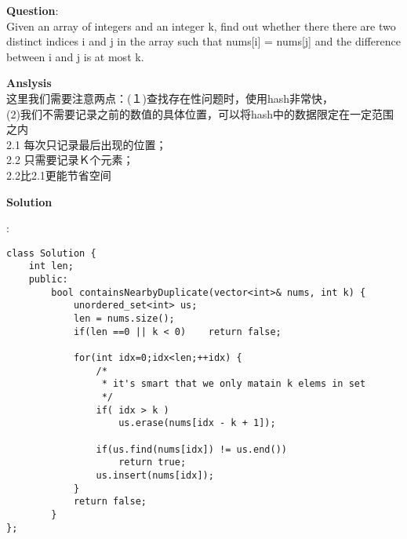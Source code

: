     
\begin{description}
    \item{\textbf{Question}}:\\%
		Given an array of integers and an integer k, find out whether there there are two distinct indices i and j in the array such that nums[i] = nums[j] and the difference between i and j is at most k.\\

    \item{\textbf{Anslysis}}\\
		这里我们需要注意两点：(１)查找存在性问题时，使用hash非常快，\\
		(2)我们不需要记录之前的数值的具体位置，可以将hash中的数据限定在一定范围之内\\
		2.1 每次只记录最后出现的位置；\\
		2.2 只需要记录Ｋ个元素；\\
		2.2比2.1更能节省空间\\

    \item{\textbf{Solution}}\\
	\item{} : \\
		\begin{lstlisting}
class Solution {
	int len;
	public:
		bool containsNearbyDuplicate(vector<int>& nums, int k) {
			unordered_set<int> us;
			len = nums.size();
			if(len ==0 || k < 0)	return false;

			for(int idx=0;idx<len;++idx) {
				/*
				 * it's smart that we only matain k elems in set
				 */
				if( idx > k ) 
					us.erase(nums[idx - k + 1]);

				if(us.find(nums[idx]) != us.end())
					return true;
				us.insert(nums[idx]);
			}
			return false;
		}
};		\end{lstlisting}

\end{description}

